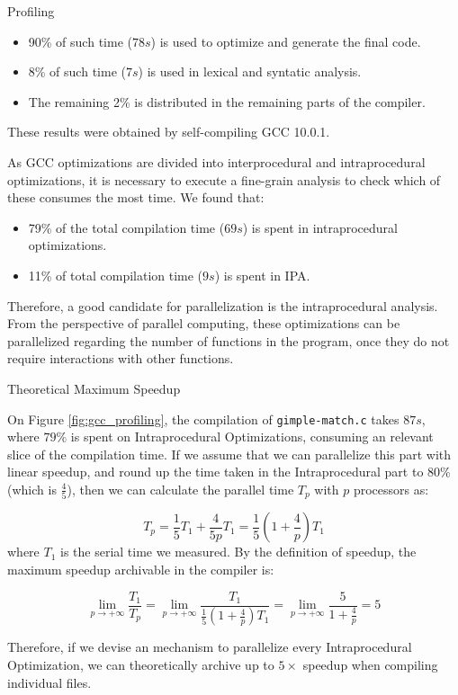 \begin{section}{Profiling}
\begin{itemize}
    \item 90\% of such time ($78s$) is used to optimize and generate the final code.

    \item 8\% of such time ($7s$) is used in lexical and syntatic analysis.

    \item The remaining 2\% is distributed in the remaining parts of the compiler.
\end{itemize}

These results were obtained by self-compiling GCC 10.0.1.

As GCC optimizations are divided into interprocedural and intraprocedural
optimizations, it is necessary to execute a fine-grain analysis to check which
of these consumes the most time. We found that:
\begin{itemize}
	\item 79\% of the total compilation time ($69s$) is spent in intraprocedural
	optimizations.

	\item 11\% of total compilation time ($9s$) is spent in IPA.
\end{itemize}

Therefore, a good candidate for parallelization is the intraprocedural
analysis. From the perspective of parallel computing, these optimizations can
be parallelized regarding the number of functions in the program, once they do
not require interactions with other functions.

\begin{subsection}{Theoretical Maximum Speedup}\label{sec:speedup}

On Figure \ref{fig:gcc_profiling}, the compilation of \texttt{gimple-match.c}
takes $87s$, where $79\%$ is spent on Intraprocedural Optimizations, consuming
an relevant slice of the compilation time. If we assume that we can parallelize
this part with linear speedup, and round up the time taken in the
Intraprocedural part to $80\%$ (which is $\frac{4}{5}$), then we can calculate
the parallel time $T_p$ with $p$ processors as:

$$ T_p = \frac{1}{5} T_1 + \frac{4}{5p}T_1 = \frac{1}{5} \left( 1 + \frac{4}{p}
\right)T_1 $$
where $T_1$ is the serial time we measured. By the definition of speedup,
the maximum speedup archivable in the compiler is:

\begin{equation}
\lim_{p \rightarrow +\infty} \frac{T_1}{T_p} = \lim_{p \rightarrow +\infty}
\frac{T_1}{\frac{1}{5} \left( 1 + \frac{4}{p} \right)T_1} = \lim_{p \rightarrow
+\infty} \frac{5}{1 + \frac{4}{p}} = 5
\label{eq:speedup}
\end{equation}

Therefore, if we devise an mechanism to parallelize every Intraprocedural
Optimization, we can theoretically archive up to $5\times$ speedup when compiling individual
files.

\end{subsection}

\end{section}

